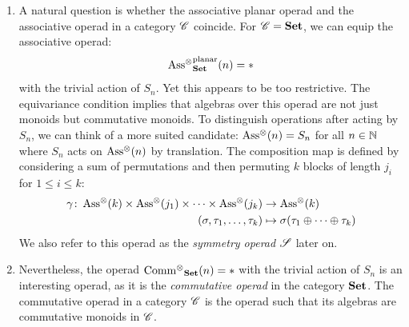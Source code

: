     \begin{egs}
        \begin{enumerate} \label{eg:operads}
            \item A natural question is whether the associative planar operad
            and the associative operad in a category $\C$ coincide.
            For $\C = \Set$, we can equip the associative operad:
            $$\Ass_{\Set}^{\text{planar}}(n) = \ast$$ with the trivial action of
            $S_n$. Yet this appears to be too restrictive. The equivariance
            condition implies that algebras over this operad are not just
            monoids but commutative monoids. To distinguish operations after
            acting by $S_n$, we can think of a more suited candidate:
            $\Ass(n)=S_n$ for all $n \in \N$ where $S_n$ acts on $\Ass(n)$ by
            translation. The composition map is defined by considering a sum of
            permutations and then permuting $k$ blocks of length $j_i$ for $1
            \leq i \leq k$: 
            \begin{align*}
                \gamma \colon \Ass(k) \times \Ass(j_1) 
                \times \dots \times \Ass(j_k) & \to \Ass(k)\\
                (\sigma, \tau_1, \dots, \tau_k) & \mapsto \sigma(\tau_1 \oplus \dots \oplus \tau_k)
            \end{align*}
            We also refer to this operad as the \emph{symmetry operad} $\S$
            later on.
            
            \item Nevertheless, the operad $\Comm_{\Set}(n) = \ast$ with the
            trivial action of $S_n$ is an interesting operad, as it is the {\em
            commutative operad} in the category $\Set$. The commutative operad
            in a category $\C$ is the operad such that its algebras are
            commutative monoids in $\C$. 
            

\end{enumerate}
\end{egs}

